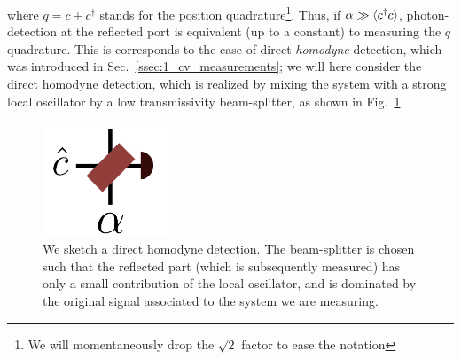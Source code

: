 where $q = c+c^\dagger$ stands for the position quadrature\footnote{We will momentaneously drop the $\sqrt{2}$ factor to ease the notation}. Thus, if $\alpha\gg\mathinner{\langle c^\dagger c\rangle}$, photon-detection at the reflected port is equivalent (up to a constant) to measuring the $q$ quadrature. This is corresponds to the case of direct \textit{homodyne} detection, which was introduced in Sec.~\ref{ssec:1_cv_measurements}; we will here consider the direct homodyne detection, which is realized by mixing the system with a strong local oscillator by a low transmissivity beam-splitter, as shown in Fig.~\ref{fig:direhom}.

\begin{figure}[t!]
    \centering
    \includegraphics[width=0.35\textwidth]{Figures/CMON/INTRO/homosimpl.png}
    \caption{We sketch a direct homodyne detection. The beam-splitter is chosen such that the reflected part (which is subsequently measured) has only a small contribution of the local oscillator, and is dominated by the original signal associated to the system we are measuring.}
    \label{fig:direhom}
\end{figure}

